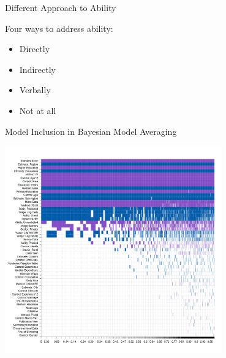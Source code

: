 \documentclass{beamer} %
\begin{document}
\begin{frame}{Different Approach to Ability}

    \begin{block}{Four ways to address ability:}
        \begin{itemize}
            \item Directly
            \item Indirectly
            \item Verbally
            \item Not at all
        \end{itemize}
    \end{block}


\end{frame}

\begin{frame}{Model Inclusion in Bayesian Model Averaging}
    \begin{center}
        \includegraphics[width=0.7\textwidth]{Figures/bma_UIP_dilut_results.png}
    \end{center}
\end{frame}




\end{document}
